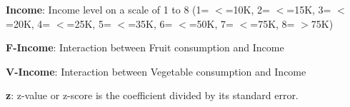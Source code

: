 \documentclass[11pt]{article}
\begin{document}
\begin{codeoutput}
\begin{table}[h]
\caption{Moderating effect of income on the relationship between diet and the risk of diabetes.}
\label{table:table_2}
\begin{threeparttable}
\renewcommand{\TPTminimum}{\linewidth}
\makebox[\linewidth]{%
\begin{tabular}{lllllll}
\toprule
 & Coef. & Std.Err & z & P$>$\textbar{}z\textbar{} & [0.025 & 0.975 \\
\midrule
\textbf{Intercept} & -1.8 & 0.0443 & -40.7 & $<$1e-06 & -1.89 & -1.72 \\
\textbf{Fruit} & -0.0497 & 0.0328 & -1.52 & 0.13 & -0.114 & 0.0146 \\
\textbf{Veggies} & -0.0459 & 0.0361 & -1.27 & 0.204 & -0.117 & 0.0249 \\
\textbf{Income} & -0.135 & 0.00598 & -22.5 & $<$1e-06 & -0.146 & -0.123 \\
\textbf{F-Income} & -0.0251 & 0.00563 & -4.46 & 8.19e-06 & -0.0361 & -0.0141 \\
\textbf{V-Income} & -0.0166 & 0.00654 & -2.54 & 0.0112 & -0.0294 & -0.00377 \\
\textbf{Age} & 0.172 & 0.00218 & 79.1 & $<$1e-06 & 0.168 & 0.176 \\
\textbf{Sex} & 0.319 & 0.0121 & 26.3 & $<$1e-06 & 0.295 & 0.343 \\
\textbf{Education} & -0.13 & 0.00636 & -20.5 & $<$1e-06 & -0.143 & -0.118 \\
\bottomrule
\end{tabular}}
\begin{tablenotes}
\footnotesize
\item \textbf{Income}: Income level on a scale of 1 to 8 (1= $<$=10K, 2= $<$=15K, 3= $<$=20K, 4= $<$=25K, 5= $<$=35K, 6= $<$=50K, 7= $<$=75K, 8= $>$75K)
\item \textbf{F-Income}: Interaction between Fruit consumption and Income
\item \textbf{V-Income}: Interaction between Vegetable consumption and Income
\item \textbf{z}: z-value or z-score is the coefficient divided by its standard error.
\end{tablenotes}
\end{threeparttable}
\end{table}

\end{codeoutput}
\end{document}

